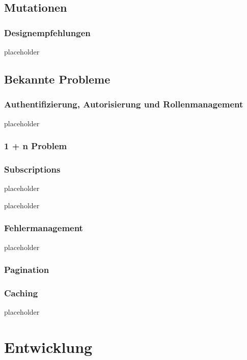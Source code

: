\documentclass[bachelor, german ]{hgbthesis}
\begin{document}
\section{Mutationen}

\subsection{Designempfehlungen}

placeholder
\pagebreak

\section{Bekannte Probleme}

\subsection{Authentifizierung, Autorisierung und Rollenmanagement}

placeholder
\pagebreak

\subsection{1 + n Problem}

\subsection{Subscriptions}

placeholder
\pagebreak

placeholder
\pagebreak

\subsection{Fehlermanagement}

placeholder
\pagebreak

\subsection{Pagination}

\subsection{Caching}

placeholder
\pagebreak

\chapter{Entwicklung}
\end{document}
